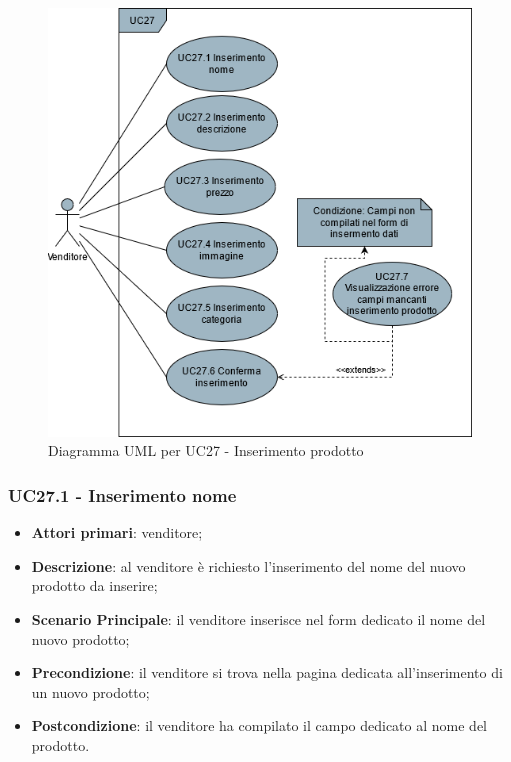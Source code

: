 \begin{figure}[H]
\centering
\includegraphics[scale=0.6]{res/UseCase/Immagini/InserimentoProdotto}
\caption{Diagramma UML per UC27 - Inserimento prodotto}
\end{figure}

\subsubsection{UC27.1 - Inserimento nome}
\begin{itemize}
\item \textbf{Attori primari}: venditore;
\item \textbf{Descrizione}: al venditore è richiesto l'inserimento del nome del nuovo prodotto da inserire;
\item \textbf{Scenario Principale}: il venditore inserisce nel form dedicato il nome del nuovo prodotto;
\item \textbf{Precondizione}: il venditore si trova nella pagina dedicata all'inserimento di un nuovo prodotto;
\item \textbf{Postcondizione}: il venditore ha compilato il campo dedicato al nome del prodotto.
\end{itemize}

